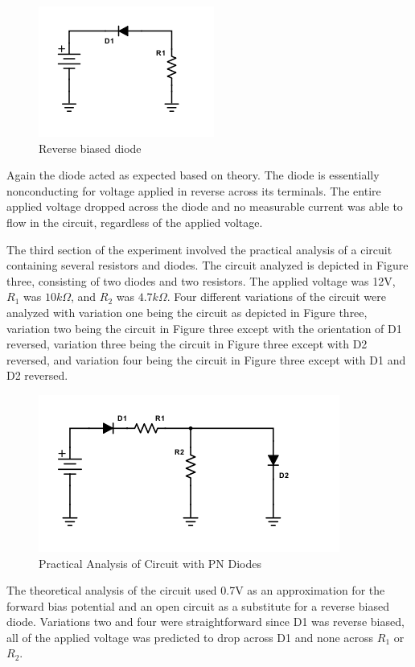 \documentclass{article}
\begin{document}
\begin{figure}[H]
\caption{Reverse biased diode}
\includegraphics[width=\textwidth]{L1F2.png}
\centering
\end{figure}
Again the diode acted as expected based on theory.  The diode is essentially nonconducting for voltage applied in reverse across its terminals.  The entire applied voltage dropped across the diode and no measurable current was able to flow in the circuit, regardless of the applied voltage.

The third section of the experiment involved the practical analysis of a circuit containing several resistors and diodes.  The circuit analyzed is depicted in Figure three, consisting of two diodes and two resistors.  The applied voltage was 12V, $R_1$ was $10k\Omega$, and $R_2$ was $4.7k\Omega$.  Four different variations of the circuit were analyzed with variation one being the circuit as depicted in Figure three, variation two being the circuit in Figure three except with the orientation of D1 reversed, variation three being the circuit in Figure three except with D2 reversed, and variation four being the circuit in Figure three except with D1 and D2 reversed.  
\begin{figure}[H]
\caption{Practical Analysis of Circuit with PN Diodes}
\includegraphics[width=\textwidth]{L1F3.png}
\centering
\end{figure}
The theoretical analysis of the circuit used 0.7V as an approximation for the forward bias potential and an open circuit as a substitute for a reverse biased diode. Variations two and four were straightforward since D1 was reverse biased, all of the applied voltage was predicted to drop across D1  and none across $R_1$ or $R_2$.  
\end{document}
